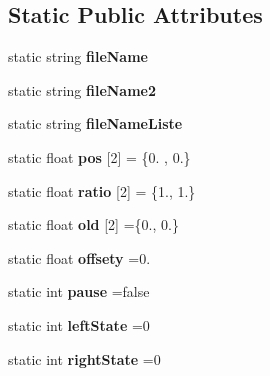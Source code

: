 \subsection*{Static Public Attributes}
\begin{DoxyCompactItemize}
\item 
\mbox{\label{classopenGlInterface_a3d916ba240cfc3bde773f3db8d0ed536}} 
static string {\bfseries file\+Name}
\item 
\mbox{\label{classopenGlInterface_a96dc191c263729869fd0a2b90fcbcccc}} 
static string {\bfseries file\+Name2}
\item 
\mbox{\label{classopenGlInterface_a30b03223a4dd046bf817de6b29cc7015}} 
static string {\bfseries file\+Name\+Liste}
\item 
\mbox{\label{classopenGlInterface_a643c200dd079c5e10142df320491daac}} 
static float {\bfseries pos} \mbox{[}2\mbox{]} = \{0. , 0.\}
\item 
\mbox{\label{classopenGlInterface_a9ce89ad19c8eef5a83916c9b02601e84}} 
static float {\bfseries ratio} \mbox{[}2\mbox{]} = \{1., 1.\}
\item 
\mbox{\label{classopenGlInterface_a5979006cb0d277e2a1171a69d36e7b0f}} 
static float {\bfseries old} \mbox{[}2\mbox{]} =\{0., 0.\}
\item 
\mbox{\label{classopenGlInterface_a9754eb99954cf48d6bbfb150ba273d2e}} 
static float {\bfseries offsety} =0.
\item 
\mbox{\label{classopenGlInterface_a22f96ee0a9a0e10fc7149ab24629e2d7}} 
static int {\bfseries pause} =false
\item 
\mbox{\label{classopenGlInterface_a9e9acd84308f7f410d29380057e09713}} 
static int {\bfseries left\+State} =0
\item 
\mbox{\label{classopenGlInterface_acdd9530d760aff3714cc4212e5b781b7}} 
static int {\bfseries right\+State} =0
\item 

\end{DoxyCompactItemize}
